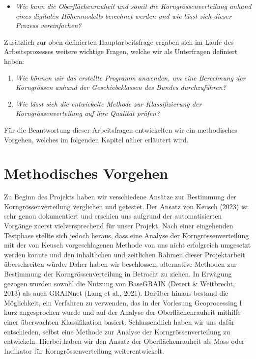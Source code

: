\documentclass[12pt]{article}
\begin{document}
        \begin{itemize}
            \item \textit{Wie kann die Oberflächenrauheit und somit die Korngrössenverteilung anhand eines digitalen Höhenmodells berechnet werden und wie lässt sich dieser Prozess vereinfachen?}
        \end{itemize}

        Zusätzlich zur oben definierten Hauptarbeitsfrage ergaben sich im Laufe des Arbeitsprozesses weitere wichtige Fragen, welche wir als Unterfragen definiert haben:

        \begin{enumerate}
            \item \textit{Wie können wir das erstellte Programm anwenden, um eine Berechnung der Korngrössen anhand der Geschiebeklassen des Bundes durchzuführen?}
            \item \textit{Wie lässt sich die entwickelte Methode zur Klassifizierung der Korngrössenverteilung auf ihre Qualität prüfen?}
        \end{enumerate}

        Für die Beantwortung dieser Arbeitsfragen entwickelten wir ein methodisches Vorgehen, welches im folgenden Kapitel näher erläutert wird.

\section{Methodisches Vorgehen}\label{sec:methodisches_vorgehen}

    Zu Beginn des Projekts haben wir verschiedene Ansätze zur Bestimmung der Korngrössenverteilung verglichen und getestet.
    Der Ansatz von Keusch (2023) ist sehr genau dokumentiert und erschien uns aufgrund der automatisierten Vorgänge zuerst vielversprechend für unser Projekt. %
    Nach einer eingehenden Testphase stellte sich jedoch heraus, dass eine Analyse der Korngrössenverteilung mit der von Keusch vorgeschlagenen Methode von uns nicht erfolgreich umgesetzt werden konnte und den inhaltlichen und zeitlichen Rahmen dieser Projektarbeit überschreiten würde.
    Daher haben wir beschlossen, alternative Methoden zur Bestimmung der Korngrössenverteilung in Betracht zu ziehen.
    In Erwägung gezogen wurden sowohl die Nutzung von BaseGRAIN (Detert & Weitbrecht, 2013) als auch GRAINnet (Lang et al., 2021). %
    Darüber hinaus bestand die Möglichkeit, ein Verfahren zu verwenden, das in der Vorlesung Geoprocessing I kurz angesprochen wurde und auf der Analyse der Oberflächenrauheit mithilfe einer überwachten Klassifikation basiert.
    Schlussendlich haben wir uns dafür entschieden, selbst eine Methode zur Analyse der Korngrössenverteilung zu entwickeln.
    Hierbei haben wir den Ansatz der Oberflächenrauheit als Mass oder Indikator für Korngrössenverteilung weiterentwickelt.
\end{document}
